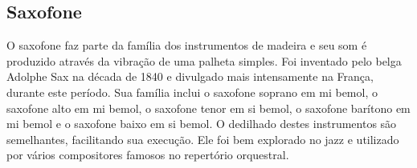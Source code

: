 \subsection*{Saxofone}

O saxofone faz parte da família dos instrumentos de madeira e seu som
é produzido através da vibração de uma palheta simples. Foi inventado
pelo belga Adolphe Sax na década de 1840 e divulgado mais intensamente
na França, durante este período. Sua família inclui o saxofone soprano
em mi bemol, o saxofone alto em mi bemol, o saxofone tenor em si
bemol, o saxofone barítono em mi bemol e o saxofone baixo em si
bemol. O dedilhado destes instrumentos são semelhantes, facilitando
sua execução. Ele foi bem explorado no jazz e utilizado por vários
compositores famosos no repertório orquestral.